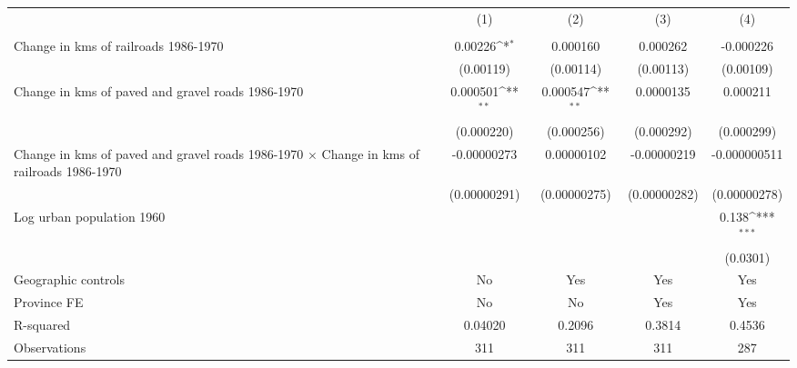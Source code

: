 {
\def\sym#1{\ifmmode^{#1}\else\(^{#1}\)\fi}
\begin{tabular}{l*{4}{c}}
\hline\hline
                &\multicolumn{1}{c}{(1)}&\multicolumn{1}{c}{(2)}&\multicolumn{1}{c}{(3)}&\multicolumn{1}{c}{(4)}\\
                &\multicolumn{1}{c}{}&\multicolumn{1}{c}{}&\multicolumn{1}{c}{}&\multicolumn{1}{c}{}\\
\hline
Change in kms of railroads 1986-1970&  0.00226\sym{*}  & 0.000160         & 0.000262         &-0.000226         \\
                &(0.00119)         &(0.00114)         &(0.00113)         &(0.00109)         \\
[1em]
Change in kms of paved and gravel roads 1986-1970& 0.000501\sym{**} & 0.000547\sym{**} &0.0000135         & 0.000211         \\
                &(0.000220)         &(0.000256)         &(0.000292)         &(0.000299)         \\
[1em]
Change in kms of paved and gravel roads 1986-1970 $\times$ Change in kms of railroads 1986-1970&-0.00000273         &0.00000102         &-0.00000219         &-0.000000511         \\
                &(0.00000291)         &(0.00000275)         &(0.00000282)         &(0.00000278)         \\
[1em]
Log urban population 1960&                  &                  &                  &    0.138\sym{***}\\
                &                  &                  &                  & (0.0301)         \\
\hline
Geographic controls&       No         &      Yes         &      Yes         &      Yes         \\
Province FE     &       No         &       No         &      Yes         &      Yes         \\
R-squared       &  0.04020         &   0.2096         &   0.3814         &   0.4536         \\
Observations    &      311         &      311         &      311         &      287         \\
\hline\hline
\end{tabular}
}
